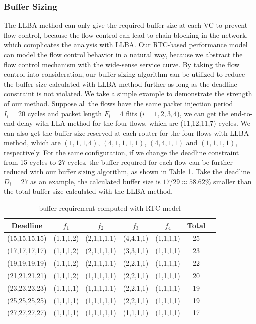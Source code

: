 \documentclass[10pt,journal]{IEEEtran}
\begin{document}
\subsubsection{Buffer Sizing}
The LLBA method \cite{189} can only give the required buffer size at each VC to prevent flow control, because the flow control can lead to chain blocking in the network, which complicates the analysis with LLBA. Our RTC-based performance model can model the flow control behavior in a natural way, because we abstract the flow control mechanism with the wide-sense service curve. By taking the flow control into consideration, our buffer sizing algorithm can be utilized to reduce the buffer size calculated with LLBA method further as long as the deadline constraint is not violated. We take a simple example to demonstrate the strength of our method. Suppose all the flows have the same packet injection period $I_i=20$ cycles and packet length $F_i=4$ flits ($i=1,2,3,4$), we can get the end-to-end delay with LLA method for the four flows, which are (11,12,11,7) cycles. We can also get the buffer size reserved at each router for the four flows with LLBA method, which are $(1,1,1,4)$, $(4,1,1,1,1)$, $(4,4,1,1)$ and $(1,1,1,1)$, respectively. For the same configuration, if we change the deadline constraint from 15 cycles to 27 cycles, the buffer required for each flow can be further reduced with our buffer sizing algorithm, as shown in Table \ref{LLBAvsRTC}. Take the deadline $D_i=27$ as an example, the calculated buffer size is $17/29\approx58.62$\% smaller than the total buffer size calculated with the LLBA method.
\begin{table}[htbp]
\centering
\caption{\label{LLBAvsRTC}buffer requirement computed with RTC model}
\begin{tabular}{|c|c|c|c|c|c|c|}
\hline
Deadline  & $f_1$  &   $f_2$   &   $f_3$   &   $f_4$   &   Total\\
\hline
(15,15,15,15)   &   (1,1,1,2)   &   (2,1,1,1,1) &   (4,4,1,1)   &   (1,1,1,1)   &   25\\
\hline
(17,17,17,17)   &   (1,1,1,2)   &   (2,1,1,1,1) &   (3,3,1,1)   &   (1,1,1,1)   &   23\\
\hline
(19,19,19,19)   &   (1,1,1,2)   &   (2,1,1,1,1) &   (2,2,1,1)   &   (1,1,1,1)   &   22\\
\hline
(21,21,21,21)   &   (1,1,1,2)   &   (1,1,1,1,1) &   (2,2,1,1)   &   (1,1,1,1)   &   20\\
\hline
(23,23,23,23)   &   (1,1,1,1)   &   (1,1,1,1,1) &   (2,2,1,1)   &   (1,1,1,1)   &   19\\
\hline
(25,25,25,25)   &   (1,1,1,1)   &   (1,1,1,1,1) &   (2,2,1,1)   &   (1,1,1,1)   &   19\\
\hline
(27,27,27,27)   &   (1,1,1,1)   &   (1,1,1,1,1) &   (1,1,1,1)   &   (1,1,1,1)   &   17\\
\hline
\end{tabular}
\end{table}
\end{document}
